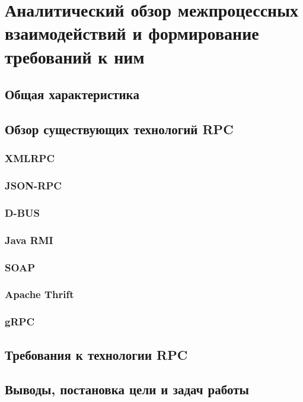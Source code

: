 \chapter{Аналитический обзор межпроцессных взаимодействий
и формирование требований к ним}

\section{Общая характеристика}

\section{Обзор существующих технологий RPC}
\subsection{XMLRPC}
\subsection{JSON-RPC}
\subsection{D-BUS}
\subsection{Java RMI}
\subsection{SOAP}
\subsection{Apache Thrift}
\subsection{gRPC}

\section{Требования к технологии RPC}

\section{Выводы, постановка цели и задач работы}
